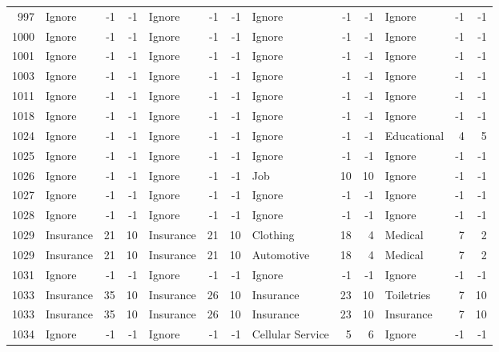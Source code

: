 \begin{figure}[htbp]
\begin{tabular}{rlrrlrrlrrlrr}
    997   & Ignore & -1    & -1    & Ignore & -1    & -1    & Ignore & -1    & -1    & Ignore & -1    & -1 \\
    1000  & Ignore & -1    & -1    & Ignore & -1    & -1    & Ignore & -1    & -1    & Ignore & -1    & -1 \\
    1001  & Ignore & -1    & -1    & Ignore & -1    & -1    & Ignore & -1    & -1    & Ignore & -1    & -1 \\
    1003  & Ignore & -1    & -1    & Ignore & -1    & -1    & Ignore & -1    & -1    & Ignore & -1    & -1 \\
    1011  & Ignore & -1    & -1    & Ignore & -1    & -1    & Ignore & -1    & -1    & Ignore & -1    & -1 \\
    1018  & Ignore & -1    & -1    & Ignore & -1    & -1    & Ignore & -1    & -1    & Ignore & -1    & -1 \\
    1024  & Ignore & -1    & -1    & Ignore & -1    & -1    & Ignore & -1    & -1    & Educational & 4     & 5 \\
    1025  & Ignore & -1    & -1    & Ignore & -1    & -1    & Ignore & -1    & -1    & Ignore & -1    & -1 \\
    1026  & Ignore & -1    & -1    & Ignore & -1    & -1    & Job   & 10    & 10    & Ignore & -1    & -1 \\
    1027  & Ignore & -1    & -1    & Ignore & -1    & -1    & Ignore & -1    & -1    & Ignore & -1    & -1 \\
    1028  & Ignore & -1    & -1    & Ignore & -1    & -1    & Ignore & -1    & -1    & Ignore & -1    & -1 \\
    1029  & Insurance & 21    & 10    & Insurance & 21    & 10    & Clothing & 18    & 4     & Medical & 7     & 2 \\
    1029  & Insurance & 21    & 10    & Insurance & 21    & 10    & Automotive & 18    & 4     & Medical & 7     & 2 \\
    1031  & Ignore & -1    & -1    & Ignore & -1    & -1    & Ignore & -1    & -1    & Ignore & -1    & -1 \\
    1033  & Insurance & 35    & 10    & Insurance & 26    & 10    & Insurance & 23    & 10    & Toiletries & 7     & 10 \\
    1033  & Insurance & 35    & 10    & Insurance & 26    & 10    & Insurance & 23    & 10    & Insurance & 7     & 10 \\
    1034  & Ignore & -1    & -1    & Ignore & -1    & -1    & Cellular Service & 5     & 6     & Ignore & -1    & -1 \\

\end{tabular}
\end{figure}
